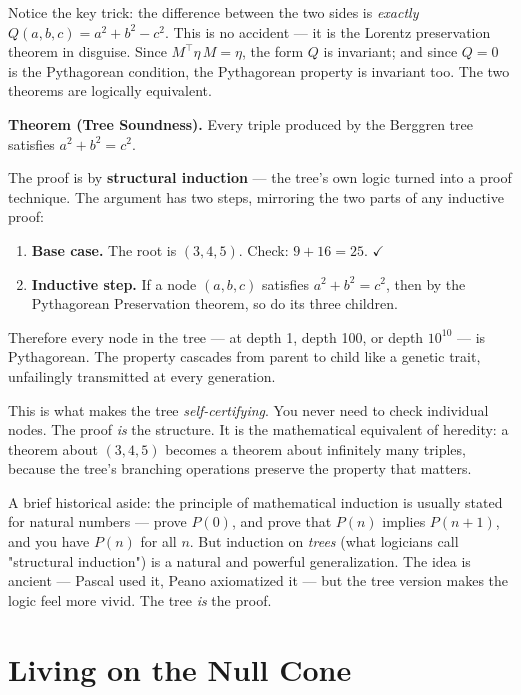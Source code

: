 \documentclass[11pt,twoside,openright]{book}
\theoremstyle{definition}
\theoremstyle{remark}
\begin{document}
Notice the key trick: the difference between the two sides is \textit{exactly} $Q(a, b, c) = a^2 + b^2 - c^2$. This is no accident --- it is the Lorentz preservation theorem in disguise. Since $M^\top \eta\, M = \eta$, the form $Q$ is invariant; and since $Q = 0$ is the Pythagorean condition, the Pythagorean property is invariant too. The two theorems are logically equivalent.

\textbf{Theorem (Tree Soundness).} Every triple produced by the Berggren tree satisfies $a^2 + b^2 = c^2$.

The proof is by \textbf{structural induction} --- the tree's own logic turned into a proof technique. The argument has two steps, mirroring the two parts of any inductive proof:

\begin{enumerate}
  \item \textbf{Base case.} The root is $(3, 4, 5)$. Check: $9 + 16 = 25$. $\checkmark$
  \item \textbf{Inductive step.} If a node $(a, b, c)$ satisfies $a^2 + b^2 = c^2$, then by the Pythagorean Preservation theorem, so do its three children.
\end{enumerate}

Therefore every node in the tree --- at depth 1, depth 100, or depth $10^{10}$ --- is Pythagorean. The property cascades from parent to child like a genetic trait, unfailingly transmitted at every generation.


This is what makes the tree \textit{self-certifying}. You never need to check individual nodes. The proof \textit{is} the structure. It is the mathematical equivalent of heredity: a theorem about $(3, 4, 5)$ becomes a theorem about infinitely many triples, because the tree's branching operations preserve the property that matters.

A brief historical aside: the principle of mathematical induction is usually stated for natural numbers --- prove $P(0)$, and prove that $P(n)$ implies $P(n+1)$, and you have $P(n)$ for all $n$. But induction on \textit{trees} (what logicians call "structural induction") is a natural and powerful generalization. The idea is ancient --- Pascal used it, Peano axiomatized it --- but the tree version makes the logic feel more vivid. The tree \textit{is} the proof.


\section{Living on the Null Cone}
\end{document}
